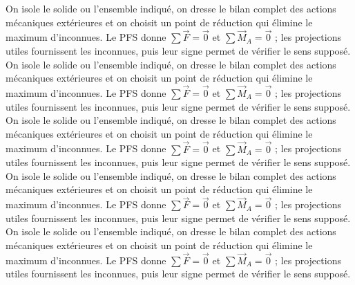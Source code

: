 \begin{corrigebox}[Corrigé]
On isole le solide ou l'ensemble indiqué, on dresse le bilan complet des actions mécaniques extérieures et on choisit un point de réduction qui élimine le maximum d'inconnues. Le PFS donne $\sum\vec F=\vec0$ et $\sum\vec M_A=\vec0$ ; les projections utiles fournissent les inconnues, puis leur signe permet de vérifier le sens supposé.
On isole le solide ou l'ensemble indiqué, on dresse le bilan complet des actions mécaniques extérieures et on choisit un point de réduction qui élimine le maximum d'inconnues. Le PFS donne $\sum\vec F=\vec0$ et $\sum\vec M_A=\vec0$ ; les projections utiles fournissent les inconnues, puis leur signe permet de vérifier le sens supposé.
On isole le solide ou l'ensemble indiqué, on dresse le bilan complet des actions mécaniques extérieures et on choisit un point de réduction qui élimine le maximum d'inconnues. Le PFS donne $\sum\vec F=\vec0$ et $\sum\vec M_A=\vec0$ ; les projections utiles fournissent les inconnues, puis leur signe permet de vérifier le sens supposé.
On isole le solide ou l'ensemble indiqué, on dresse le bilan complet des actions mécaniques extérieures et on choisit un point de réduction qui élimine le maximum d'inconnues. Le PFS donne $\sum\vec F=\vec0$ et $\sum\vec M_A=\vec0$ ; les projections utiles fournissent les inconnues, puis leur signe permet de vérifier le sens supposé.
On isole le solide ou l'ensemble indiqué, on dresse le bilan complet des actions mécaniques extérieures et on choisit un point de réduction qui élimine le maximum d'inconnues. Le PFS donne $\sum\vec F=\vec0$ et $\sum\vec M_A=\vec0$ ; les projections utiles fournissent les inconnues, puis leur signe permet de vérifier le sens supposé.
\end{corrigebox}
